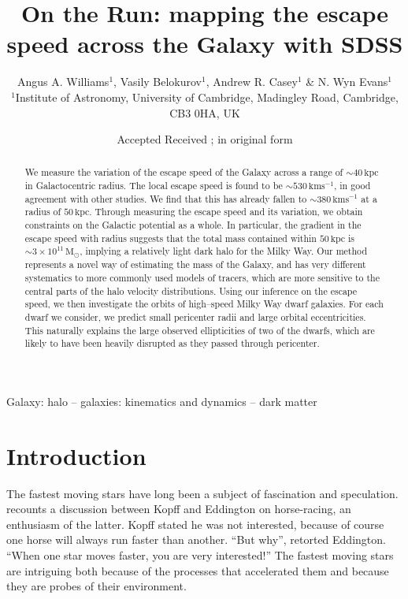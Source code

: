 \documentclass[useAMS,twocolumn,usenatbib]{mn2e}
\title[Fast moving stars in SDSS] {On the Run: mapping the escape
  speed across the Galaxy with SDSS}
\author[Williams, Belokurov, Casey \& Evans]{Angus A. Williams$^1$,
  Vasily Belokurov$^1$, Andrew R. Casey$^1$ \& N. Wyn Evans$^1$
  \medskip
  \\$^1$Institute of Astronomy, University of Cambridge, Madingley Road,
       Cambridge, CB3 0HA, UK}
\def\kpc{{\,\mathrm{kpc}}}
\def\kms{{\,\mathrm{kms^{-1}}}}
\def\Msun{{\,\mathrm{M}_\odot}}
\begin{document}
\date{Accepted  Received ; in original form }

\pagerange{\pageref{firstpage}--\pageref{lastpage}} 

\maketitle

\label{firstpage}

\begin{abstract}
We measure the variation of the escape speed of the Galaxy across a
range of $\sim 40\kpc$ in Galactocentric radius. The local escape
speed is found to be $\sim 530\kms$, in good agreement with other
studies. We find that this has already fallen to $\sim 380\kms$ at a
radius of $50\kpc$. Through measuring the escape speed and its
variation, we obtain constraints on the Galactic potential as a
whole. In particular, the gradient in the escape speed with radius
suggests that the total mass contained within $50\kpc$ is $\sim
3\times10^{11}\Msun$, implying a relatively light dark halo for the
Milky Way. Our method represents a novel way of estimating the mass of
the Galaxy, and has very different systematics to more commonly used
models of tracers, which are more sensitive to the central parts of
the halo velocity distributions. Using our inference on the escape
speed, we then investigate the orbits of high--speed Milky Way dwarf
galaxies. For each dwarf we consider, we predict small pericenter
radii and large orbital eccentricities. This naturally explains the
large observed ellipticities of two of the dwarfs, which are likely to
have been heavily disrupted as they passed through pericenter.
\end{abstract}

\begin{keywords}
Galaxy: halo -- galaxies: kinematics and dynamics -- dark matter
\end{keywords}

\section{Introduction}

The fastest moving stars have long been a subject of fascination and
speculation. \citet{Vi56} recounts a discussion between Kopff and
Eddington on horse-racing, an enthusiasm of the latter. Kopff stated
he was not interested, because of course one horse will always run
faster than another.  ``But why'', retorted Eddington. ``When one star
moves faster, you are very interested!'' The fastest moving stars are
intriguing both because of the processes that accelerated them and
because they are probes of their environment.
\end{document}
